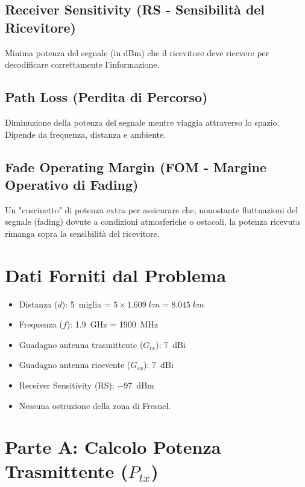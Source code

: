 \subsection*{Receiver Sensitivity (RS - Sensibilità del Ricevitore)}
Minima potenza del segnale (in dBm) che il ricevitore deve ricevere per decodificare correttamente l'informazione.

\subsection*{Path Loss (Perdita di Percorso)}
Diminuzione della potenza del segnale mentre viaggia attraverso lo spazio. Dipende da frequenza, distanza e ambiente.

\subsection*{Fade Operating Margin (FOM - Margine Operativo di Fading)}
Un "cuscinetto" di potenza extra per assicurare che, nonostante fluttuazioni del segnale (fading) dovute a condizioni atmosferiche o ostacoli, la potenza ricevuta rimanga sopra la sensibilità del ricevitore.

\section{Dati Forniti dal Problema}
\begin{itemize}
    \item Distanza ($d$): \SI{5}{miglia} = $5 \times \SI{1.609}{km} = \SI{8.045}{km}$
    \item Frequenza ($f$): \SI{1.9}{GHz} = \SI{1900}{MHz}
    \item Guadagno antenna trasmittente ($G_{tx}$): \SI{+7}{dBi}
    \item Guadagno antenna ricevente ($G_{rx}$): \SI{+7}{dBi}
    \item Receiver Sensitivity (RS): \SI{-97}{dBm}
    \item Nessuna ostruzione della zona di Fresnel.
\end{itemize}

\section{Parte A: Calcolo Potenza Trasmittente ($P_{tx}$)}

